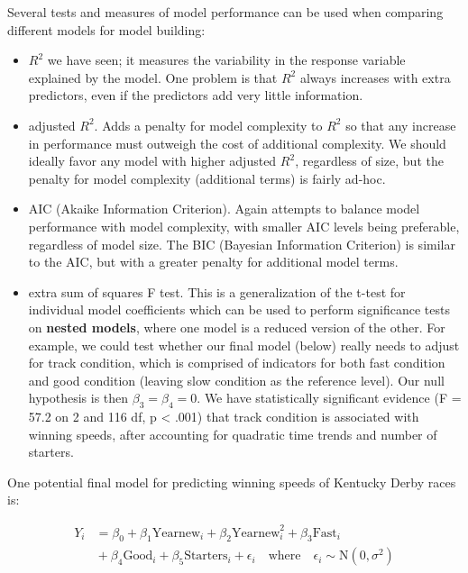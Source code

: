 \documentclass[
]{krantz}
\providecommand{\tightlist}{%
  \setlength{\itemsep}{0pt}\setlength{\parskip}{0pt}}
\begin{document}
Several tests and measures of model performance can be used when comparing different models for model building:

\begin{itemize}
\tightlist
\item
  \(R^2\)  we have seen; it measures the variability in the response variable explained by the model. One problem is that \(R^2\) always increases with extra predictors, even if the predictors add very little information.
\item
  adjusted \(R^2\).  Adds a penalty for model complexity to \(R^2\) so that any increase in performance must outweigh the cost of additional complexity. We should ideally favor any model with higher adjusted \(R^2\), regardless of size, but the penalty for model complexity (additional terms) is fairly ad-hoc.
\item
  AIC (Akaike Information Criterion).  Again attempts to balance model performance with model complexity, with smaller AIC levels being preferable, regardless of model size. The BIC (Bayesian Information Criterion)  is similar to the AIC, but with a greater penalty for additional model terms.
\item
  extra sum of squares F test. This is a generalization of the t-test for individual model coefficients which can be used to perform significance tests on \textbf{nested models},  where one model is a reduced version of the other. For example, we could test whether our final model (below) really needs to adjust for track condition, which is comprised of indicators for both fast condition and good condition (leaving slow condition as the reference level). Our null hypothesis is then \(\beta_{3}=\beta_{4}=0\). We have statistically significant evidence (F = 57.2 on 2 and 116 df, p \textless{} .001) that track condition is associated with winning speeds, after accounting for quadratic time trends and number of starters.
\end{itemize}

One potential final model for predicting winning speeds of Kentucky Derby races is:

\begin{equation}
\begin{split}
 Y_{i}&=\beta_{0}+\beta_{1}\textrm{Yearnew}_{i}+\beta_{2}\textrm{Yearnew}^2_{i}+\beta_{3}\textrm{Fast}_{i}\\
      &{}+\beta_{4}\textrm{Good}_{i}+\beta_{5}\textrm{Starters}_{i}+\epsilon_{i}\quad 
      \textrm{where}\quad \epsilon_{i}\sim \textrm{N}(0,\sigma^2)
\end{split}
\label{eq:model0}
\end{equation}
\end{document}
